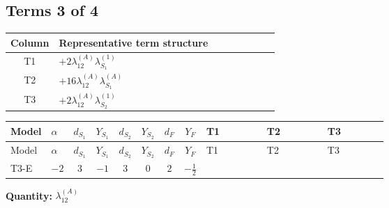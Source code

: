 \documentclass[8pt]{article}
\begin{document}
\begin{landscape}
\subsection*{Terms 3 of 4}
\begin{center}
\begin{tabular}{@{}c >{\raggedright\arraybackslash}p{0.82\linewidth}@{}}
\toprule
Column & Representative term structure \\
\midrule
T1 & \(\displaystyle +2 {\lambda_{12}^{(A)}} {\lambda_{S_1}^{(1)}}\) \\
\midrule
T2 & \(\displaystyle +16 {\lambda_{12}^{(A)}} {\lambda_{S_1}^{(A)}}\) \\
\midrule
T3 & \(\displaystyle +2 {\lambda_{12}^{(A)}} {\lambda_{S_2}^{(1)}}\) \\
\midrule
\bottomrule
\end{tabular}
\end{center}
\smallskip
\tiny
\begin{longtable}{@{}llcccccc >{\raggedright\arraybackslash}p{0.21\linewidth} >{\raggedright\arraybackslash}p{0.21\linewidth} >{\raggedright\arraybackslash}p{0.21\linewidth}@{}}
\toprule
Model & $\alpha$ & $d_{S_1}$ & $Y_{S_1}$ & $d_{S_2}$ & $Y_{S_2}$ & $d_F$ & $Y_F$ & T1 & T2 & T3 \\
\midrule
\endfirsthead
\toprule
Model & $\alpha$ & $d_{S_1}$ & $Y_{S_1}$ & $d_{S_2}$ & $Y_{S_2}$ & $d_F$ & $Y_F$ & T1 & T2 & T3 \\
\midrule
\endhead
T3-E & $-2$ & $3$ & $-1$ & $3$ & $0$ & $2$ & $-\frac{1}{2}$ & \scriptsize\adjustbox{max width=\linewidth}{$\begin{gathered} +2 {\lambda_{12}^{(A)}} {\lambda_{S_1}^{(1)}}\end{gathered}$} & \scriptsize\adjustbox{max width=\linewidth}{$\begin{gathered} +16 {\lambda_{12}^{(A)}} {\lambda_{S_1}^{(A)}}\end{gathered}$} & \scriptsize\adjustbox{max width=\linewidth}{$\begin{gathered} +2 {\lambda_{12}^{(A)}} {\lambda_{S_2}^{(1)}}\end{gathered}$} \\
\midrule
\bottomrule
\end{longtable}
\clearpage
\noindent\textbf{Quantity: }$\lambda_{12}^{(A)}$\par\smallskip

\end{landscape}
\end{document}
